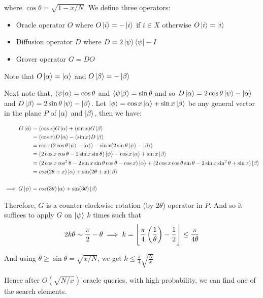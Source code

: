 \documentclass{article}
\DeclarePairedDelimiter\floor{\lfloor}{\rfloor}
\begin{document}
where $\cos \theta = \sqrt{1-x/N}$. We define three operators:
\begin{itemize}
    \item Oracle operator $O$ where $O\ket i = - \ket i$ if $i \in X$ otherwise $O\ket i = \ket i$
    \item Diffusion operator $D$ where $D = 2 \ket \psi \bra \psi - I$
    \item Grover operator $G = DO$
\end{itemize}

Note that $O\ket \alpha = \ket \alpha$ and $O\ket \beta = -\ket \beta$

Next note that, $\braket{\psi | \alpha} = \cos \theta$ and $\braket{\psi | \beta} = \sin \theta$ and so $D\ket \alpha = 2\cos \theta \ket \psi - \ket \alpha$ and $D\ket \beta = 2\sin \theta \ket \psi - \ket \beta$. Let $\ket \phi = \cos x \ket \alpha + \sin x \ket \beta$ be any general vector in the plane $P$ of $\ket \alpha$ and $\ket \beta$, then we have:

\begin{align*}
    G \ket \phi &= (\cos x) G \ket \alpha + (\sin x) G \ket \beta \\
    &= (\cos x) D \ket \alpha - (\sin x) D \ket \beta \\
    &= \cos x (2 \cos \theta \ket \psi - \ket \alpha) - \sin x (2 \sin \theta \ket \psi - \ket \beta) \\
    &= (2 \cos x \cos \theta - 2 \sin x \sin \theta) \ket \psi - \cos x \ket \alpha + \sin x \ket \beta \\
    &= (2 \cos x \cos^2 \theta - 2 \sin x \sin \theta \cos \theta - \cos x) \ket \alpha + (2 \cos x \cos \theta \sin \theta - 2 \sin x \sin^2 \theta + \sin x) \ket \beta \\
    &= cos (2\theta + x) \ket \alpha + \sin (2\theta + x) \ket \beta \\
    \\
    \implies G \ket{\psi} &= cos (3\theta) \ket \alpha + \sin (3\theta) \ket \beta
\end{align*}

Therefore, $G$ is a counter-clockwise rotation (by $2\theta$) operator in $P$. And so it suffices to apply $G$ on $\ket \psi$ $k$ times such that $$2k\theta \sim \frac{\pi}{2} - \theta \implies k = \floor*{\frac{\pi}{4}\left(\frac{1}{\theta}\right) - \frac12} \leq  \frac{\pi}{4\theta}$$

And using $\theta \geq \sin \theta = \sqrt{x/N}$, we get $\boxed{k \leq \frac{\pi}{4}\sqrt{\frac{N}{x}}}$

Hence after $O(\sqrt{N/x})$ oracle queries, with high probability, we can find one of the search elements.
\end{document}
